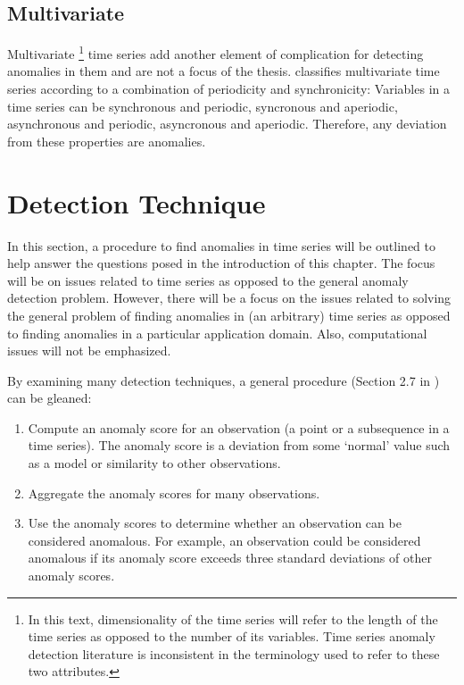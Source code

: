 \subsection{Multivariate}

Multivariate \footnote{In this text, dimensionality of the time series will refer to the length of the time series as opposed to the number of its variables. Time series anomaly detection literature is inconsistent in the terminology used to refer to these two attributes.} time series add another element of complication for detecting anomalies in them and are not a focus of the thesis. \cite{Cheboli2010} classifies multivariate time series according to a combination of periodicity and synchronicity: Variables in a time series can be synchronous and periodic, syncronous and aperiodic, asynchronous and periodic, asyncronous and aperiodic. Therefore, any deviation from these properties are anomalies.




\section[adproc]{Detection Technique}


In this section, a procedure to find anomalies in time series will be outlined to help answer the questions posed in the introduction of this chapter. The focus will be on issues related to time series as opposed to the general anomaly detection problem. However, there will be a focus on the issues related to solving the general problem of finding anomalies in (an arbitrary) time series as opposed to finding anomalies in a particular application domain. Also, computational issues will not be emphasized.

By examining many detection techniques, a general procedure (Section 2.7 in \cite{Cheboli2010}) can be gleaned:

\begin{enumerate}
\item Compute an anomaly score for an observation (a point or a subsequence in a time series). The anomaly score is a deviation from some `normal' value such as a model or similarity to other observations.
\item Aggregate the anomaly scores for many observations.
\item Use the anomaly scores to determine whether an observation can be considered anomalous. For example, an observation could be considered anomalous if its anomaly score exceeds three standard deviations of other anomaly scores.
\end{enumerate}

